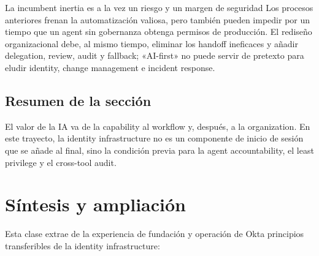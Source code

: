 \documentclass[a4paper]{article}
\begin{document}

\begin{warningbox}{La incumbent inertia es a la vez un riesgo y un margen de seguridad}
Los procesos anteriores frenan la automatización valiosa, pero también pueden impedir por un tiempo que un agent sin gobernanza obtenga permisos de producción. El rediseño organizacional debe, al mismo tiempo, eliminar los handoff ineficaces y añadir delegation, review, audit y fallback; «AI-first» no puede servir de pretexto para eludir identity, change management e incident response.
\end{warningbox}

\subsection{Resumen de la sección}

El valor de la IA va de la capability al workflow y, después, a la organization. En este trayecto, la identity infrastructure no es un componente de inicio de sesión que se añade al final, sino la condición previa para la agent accountability, el least privilege y el cross-tool audit.
\section{Síntesis y ampliación}

Esta clase extrae de la experiencia de fundación y operación de Okta principios transferibles de la identity infrastructure:
\end{document}
